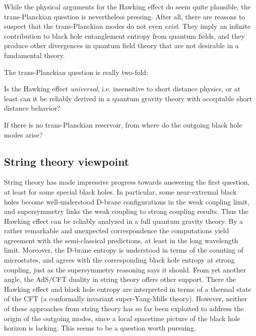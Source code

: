 \documentclass[12pt]{article}
\begin{document}
While the physical arguments for the Hawking effect 
do seem quite plausible, the trans-Planckian question 
is nevertheless pressing. After all, there are reasons 
to suspect that the trans-Planckian modes do not even 
{\it exist}. They imply an infinite contribution to 
black hole entanglement entropy from quantum fields, and they produce
other divergences in quantum field theory that are not desirable in a fundamental theory. 

The trans-Planckian question is really two-fold:
\ben
\item Is the Hawking effect {\it universal}, i.e. insensitive to short distance physics, or 
at least can it be reliably derived in a quantum gravity theory with 
acceptable short distance behavior?
\item If there is no trans-Planckian reservoir, from where do the outgoing black hole modes arise?
\een

\subsection{String theory viewpoint}
String theory has made impressive progress towards answering the first question, at least for some special black holes. In particular\cite{Horowitz:1996rn,Peet:1997es}, some near-extremal black holes become well-understood D-brane configurations in the weak coupling limit, and supersymmetry links the weak coupling to strong coupling results. Thus the Hawking effect can be reliably analyzed in a full quantum gravity theory. 
By a rather remarkable and unexpected correspondence the computations yield agreement with the semi-classical predictions, at least in the long wavelength limit.
Moreover, the D-brane entropy is understood in terms of the counting of microstates, and agrees with the corresponding black hole entropy at strong coupling, just as the supersymmetry reasoning says it should. From yet another angle, the AdS/CFT duality in string theory offers other support\cite{magoo}.  There the Hawking effect and black hole entropy are interpreted in terms of a thermal state of the CFT (a conformally invariant super-Yang-Mills
theory). However, neither of these approaches from string theory has so far been exploited to address the origin of the outgoing modes, since a local spacetime picture of the black hole horizon is lacking. This seems to be a question worth pursuing.
\end{document}
